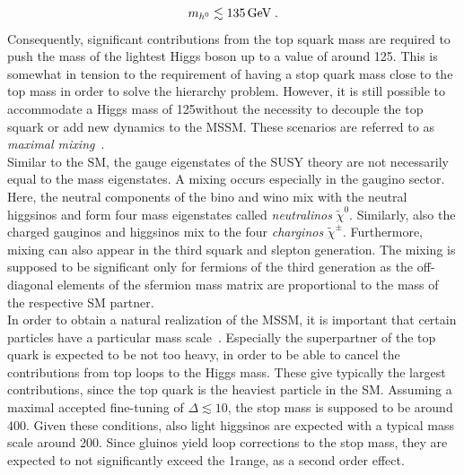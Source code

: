 \begin{equation*}
m_{h^0} \lesssim 135 \,\text{Ge}\kern-0.06667em\text{V} \; .
\end{equation*}
Consequently, significant contributions from the top squark mass are required to push the mass of the lightest Higgs boson up to a value of around 125\gev. This is somewhat in tension to the requirement of having a stop quark mass close to the top mass in order to solve the hierarchy problem. However, it is still possible to accommodate a Higgs mass of 125\gev without the necessity to decouple the top squark or add new dynamics to the MSSM. These scenarios are referred to as \textit{maximal mixing}~\cite{Djouadi:2005gj}. \\
Similar to the SM, the gauge eigenstates of the SUSY theory are not necessarily equal to the mass eigenstates. A mixing occurs especially in the gaugino sector. Here, the neutral components of the bino and wino mix with the neutral higgsinos and form four mass eigenstates called \textit{neutralinos} $\tilde{\chi}^0$. Similarly, also the charged gauginos and higgsinos mix to the four \textit{charginos} $\tilde{\chi}^{\pm}$. Furthermore, mixing can also appear in the third squark and slepton generation. The mixing is supposed to be significant only for fermions of the third generation as the off-diagonal elements of the sfermion mass matrix are proportional to the mass of the respective SM partner. \\
In order to obtain a natural realization of the MSSM, it is important that certain particles have a particular mass scale~\cite{Craig:2013cxa}. Especially the superpartner of the top quark is expected to be not too heavy, in order to be able to cancel the contributions from top loops to the Higgs mass. These give typically the largest contributions, since the top quark is the heaviest particle in the SM. Assuming a maximal accepted fine-tuning of $\Delta \lesssim 10$, the stop mass is supposed to be around 400\gev. Given these conditions, also light higgsinos are expected with a typical mass scale around 200\gev. Since gluinos yield loop corrections to the stop mass, they are expected to not significantly exceed the 1\tev range, as a second order effect. 

